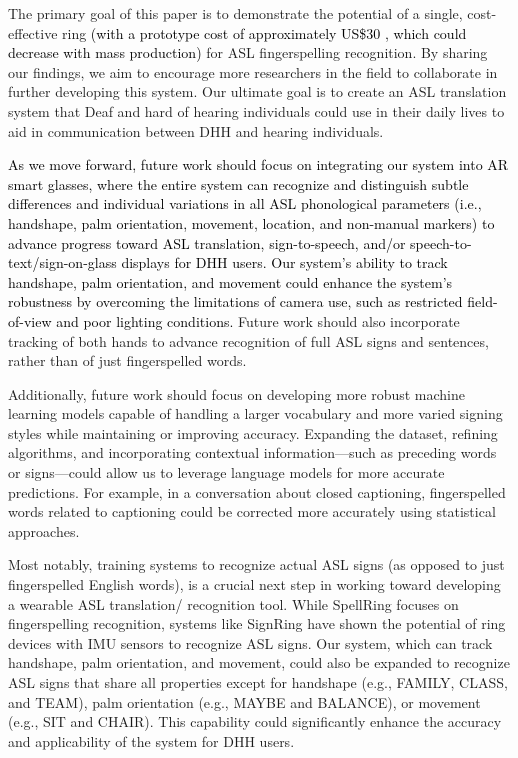 The primary goal of this paper is to demonstrate the potential of a single, cost-effective ring \textcolor{black}{(with a prototype cost of approximately US\$30 \cite{yu2024ring}, which could decrease with mass production)} for ASL fingerspelling recognition. By sharing our findings, we aim to encourage more researchers in the field to collaborate in further developing this system.  Our ultimate goal is to create an ASL translation system that Deaf and hard of hearing individuals could use in their daily lives to aid in communication between DHH and hearing individuals. 

\textcolor{black}{As we move forward, future work should focus on integrating our system into AR smart glasses, where the entire system can recognize and distinguish subtle differences and individual variations in all ASL phonological parameters (i.e., handshape, palm orientation, movement, location, and non-manual markers) \cite{valli1992linguistics} to advance progress toward ASL translation, sign-to-speech, and/or speech-to-text/sign-on-glass displays for DHH users. Our system's ability to track handshape, palm orientation, and movement could enhance the system's robustness by overcoming the limitations of camera use, such as restricted field-of-view and poor lighting conditions.} Future work should also incorporate tracking of both hands to advance recognition of full ASL signs and sentences, rather than of just fingerspelled words.

Additionally, future work should focus on developing more robust machine learning models capable of handling a larger vocabulary and more varied signing styles while maintaining or improving accuracy. Expanding the dataset, refining algorithms, and incorporating contextual information—such as preceding words or signs—could allow us to leverage language models for more accurate predictions. For example, in a conversation about closed captioning, fingerspelled words related to captioning could be corrected more accurately using statistical approaches.

Most notably, training systems to recognize actual ASL signs (as opposed to just fingerspelled English words), is a crucial next step in working toward developing a wearable ASL translation/ recognition tool. While SpellRing focuses on fingerspelling recognition, systems like SignRing \cite{li2023signring} have shown the potential of ring devices with IMU sensors to recognize ASL signs. Our system, which can track handshape, palm orientation, and movement, could also be expanded to recognize ASL signs that share all properties except for handshape (e.g., FAMILY, CLASS, and TEAM), palm orientation (e.g., MAYBE and BALANCE), or movement (e.g., SIT and CHAIR). This capability could significantly enhance the accuracy and applicability of the system for DHH users. 


